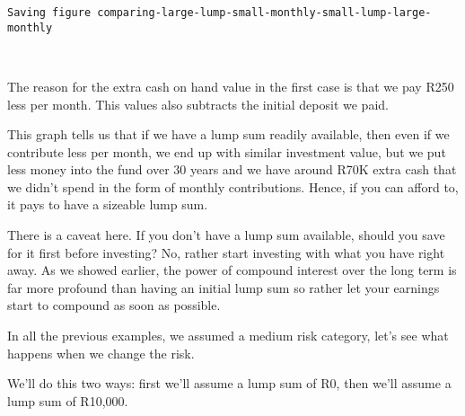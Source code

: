 \documentclass[11pt]{article}
\begin{document}
    \begin{Verbatim}[commandchars=\\\{\}]
Saving figure comparing-large-lump-small-monthly-small-lump-large-monthly

    \end{Verbatim}

    \begin{center}
    \end{center}
    { \hspace*{\fill} \\}
    
    The reason for the extra cash on hand value in the first case is that we
pay R250 less per month. This values also subtracts the initial deposit
we paid.

This graph tells us that if we have a lump sum readily available, then
even if we contribute less per month, we end up with similar investment
value, but we put less money into the fund over 30 years and we have
around R70K extra cash that we didn't spend in the form of monthly
contributions. Hence, if you can afford to, it pays to have a sizeable
lump sum.

There is a caveat here. If you don't have a lump sum available, should
you save for it first before investing? No, rather start investing with
what you have right away. As we showed earlier, the power of compound
interest over the long term is far more profound than having an initial
lump sum so rather let your earnings start to compound as soon as
possible.

In all the previous examples, we assumed a medium risk category, let's
see what happens when we change the risk.

We'll do this two ways: first we'll assume a lump sum of R0, then we'll
assume a lump sum of R10,000.
\end{document}
